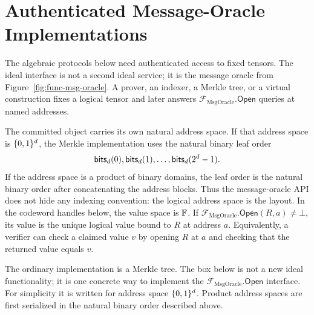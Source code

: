 \section{Authenticated Message-Oracle Implementations}

The algebraic protocols below need authenticated access to fixed tensors.  The
ideal interface is not a second ideal service; it is the message
oracle from Figure~\ref{fig:func-msg-oracle}.  A prover, an indexer, a Merkle
tree, or a virtual construction fixes a logical tensor and later answers
\(\mathcal F_{\mathrm{MsgOracle}}.\mathsf{Open}\) queries at named addresses.

The committed object carries its own natural address space.  If that address
space is \(\{0,1\}^d\), the Merkle implementation uses the natural binary leaf order
\[
  \mathsf{bits}_d(0),\mathsf{bits}_d(1),\ldots,\mathsf{bits}_d(2^d-1).
\]
If the address space is a product of binary domains, the leaf order is the
natural binary order after concatenating the address blocks.  Thus the
message-oracle API does not hide any indexing convention: the logical address
space is the layout.  In the codeword handles below, the value space is \(\mathbb{F}\).
If \(\mathcal F_{\mathrm{MsgOracle}}.\mathsf{Open}(R,a)\ne\bot\), its value is
the unique logical value bound to \(R\) at address \(a\).  Equivalently, a
verifier can check a claimed value \(v\) by opening \(R\) at \(a\) and checking
that the returned value equals \(v\).

The ordinary implementation is a Merkle tree.  The box below is not a new ideal
functionality; it is one concrete way to implement the
\(\mathcal F_{\mathrm{MsgOracle}}.\mathsf{Open}\) interface.  For simplicity it
is written for address space \(\{0,1\}^d\).  Product address spaces are first
serialized in the natural binary order described above.


